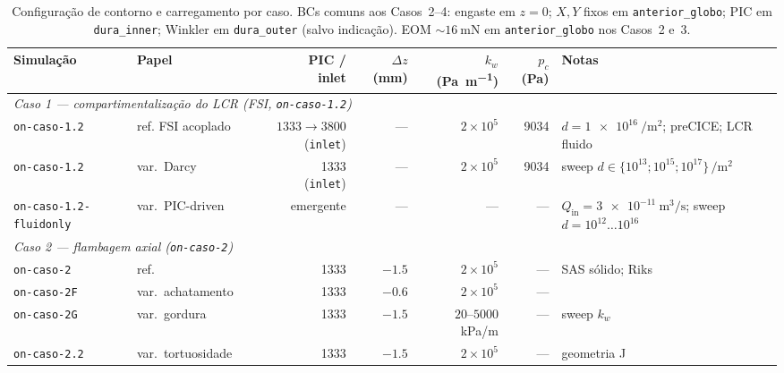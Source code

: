 \documentclass[article, hidelinks,oneside,12pt]{abntex2}
\begin{document}
\begin{table}[h!]
\centering
\footnotesize
\setlength{\tabcolsep}{3.5pt}
\caption{Configuração de contorno e carregamento por caso. BCs comuns aos Casos~2--4: engaste em $z=0$; $X,Y$ fixos em \texttt{anterior\_globo}; PIC em \texttt{dura\_inner}; Winkler em \texttt{dura\_outer} (salvo indicação). EOM $\sim\SI{16}{\milli\newton}$ em \texttt{anterior\_globo} nos Casos~2 e~3.}
\label{tab:casos-setup}
\begin{tabular}{l l r r r r l}
\toprule
\textbf{Simulação} & \textbf{Papel} & \makecell{PIC /\\inlet} & \makecell{$\Delta z$\\(\si{\milli\meter})} & \makecell{$k_w$\\(\si{\pascal\per\meter})} & \makecell{$p_c$\\(\si{\pascal})} & \textbf{Notas} \\
\midrule
\multicolumn{7}{l}{\textit{Caso 1 --- compartimentalização do LCR (FSI, \texttt{on-caso-1.2})}} \\
\texttt{on-caso-1.2} & ref. FSI acoplado & \makecell{$1333 \to 3800$\\(\texttt{inlet})} & --- & $2\times10^5$ & 9034 & \makecell{$d=\SI{1e16}{\per\meter\squared}$;\\preCICE; LCR fluido} \\
\texttt{on-caso-1.2} & var.\ Darcy & \makecell{1333\\(\texttt{inlet})} & --- & $2\times10^5$ & 9034 & \makecell{sweep $d \in \{10^{13};\\10^{15};10^{17}\}\,\si{\per\meter\squared}$} \\
\texttt{on-caso-1.2-fluidonly} & var.\ PIC-driven & emergente & --- & --- & --- & \makecell{$Q_{\mathrm{in}}=\SI{3e-11}{\meter\cubed\per\second}$;\\sweep $d=10^{12}\ldots10^{16}$} \\
\midrule
\multicolumn{7}{l}{\textit{Caso 2 --- flambagem axial (\texttt{on-caso-2})}} \\
\texttt{on-caso-2} & ref. & 1333 & $-1.5$ & $2\times10^5$ & --- & SAS sólido; Riks \\
\texttt{on-caso-2F} & var.\ achatamento & 1333 & $-0.6$ & $2\times10^5$ & --- & \cite{reilly2023} \\
\texttt{on-caso-2G} & var.\ gordura & 1333 & $-1.5$ & \makecell{$20\text{--}5000$\\kPa/m} & --- & sweep $k_w$ \\
\texttt{on-caso-2.2} & var.\ tortuosidade & 1333 & $-1.5$ & $2\times10^5$ & --- & geometria J \\

\end{tabular}
\end{table}
\end{document}
